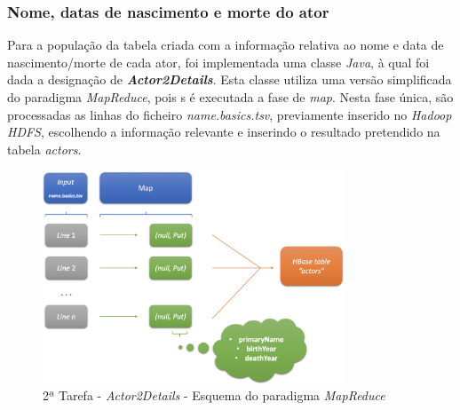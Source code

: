 \documentclass[a4paper]{report}
\begin{document}
{		\subsubsection{Nome, datas de nascimento e morte do ator} \label{sssec:Task2-3-1}
		Para a população da tabela criada com a informação relativa ao nome e data de nascimento/morte de cada ator, foi implementada uma classe \textit{Java}, à qual foi dada a designação de \textbf{\textit{Actor2Details}}.
		Esta classe utiliza uma versão simplificada do paradigma \textit{MapReduce}, pois s é executada a fase de \textit{map}.
		Nesta fase única, são processadas as linhas do ficheiro \textit{name.basics.tsv}, previamente inserido no \textit{Hadoop HDFS}, escolhendo a informação relevante e inserindo o resultado pretendido na tabela \textit{actors}.
		\begin{figure}[H]
			\centering
			\includegraphics[width=0.8\textwidth]{Imagens/2ª Tarefa - Actor2Details - Esquema MapReduce.png}
			\caption{2ª Tarefa - \textit{Actor2Details} - Esquema do paradigma \textit{MapReduce}}
			\label{fig:18}
		\end{figure}
		
}
\end{document}
